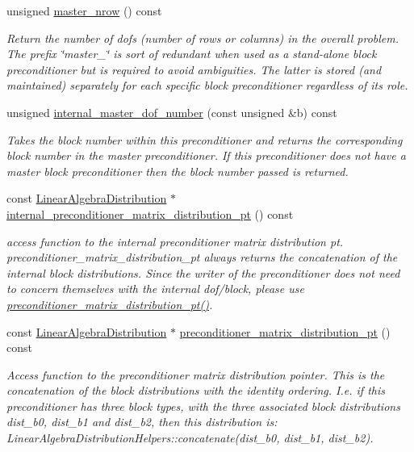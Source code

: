 \begin{DoxyCompactItemize}
unsigned \hyperlink{classoomph_1_1BlockPreconditioner_a3e5b553f65e6c25354a5c908d507e8ee}{master\+\_\+nrow} () const
\begin{DoxyCompactList}\small\item\em Return the number of dofs (number of rows or columns) in the overall problem. The prefix \char`\"{}master\+\_\+\char`\"{} is sort of redundant when used as a stand-\/alone block preconditioner but is required to avoid ambiguities. The latter is stored (and maintained) separately for each specific block preconditioner regardless of its role. \end{DoxyCompactList}\item 
unsigned \hyperlink{classoomph_1_1BlockPreconditioner_a7297e4d24c2c7ae7af6a9ad009669928}{internal\+\_\+master\+\_\+dof\+\_\+number} (const unsigned \&b) const
\begin{DoxyCompactList}\small\item\em Takes the block number within this preconditioner and returns the corresponding block number in the master preconditioner. If this preconditioner does not have a master block preconditioner then the block number passed is returned. \end{DoxyCompactList}\item 
const \hyperlink{classoomph_1_1LinearAlgebraDistribution}{Linear\+Algebra\+Distribution} $\ast$ \hyperlink{classoomph_1_1BlockPreconditioner_a3a16de88bd5369e729d761a6498fdd3f}{internal\+\_\+preconditioner\+\_\+matrix\+\_\+distribution\+\_\+pt} () const
\begin{DoxyCompactList}\small\item\em access function to the internal preconditioner matrix distribution pt. preconditioner\+\_\+matrix\+\_\+distribution\+\_\+pt always returns the concatenation of the internal block distributions. Since the writer of the preconditioner does not need to concern themselves with the internal dof/block, please use \hyperlink{classoomph_1_1BlockPreconditioner_a74eeff188f842dd8abdff1b7d9801d44}{preconditioner\+\_\+matrix\+\_\+distribution\+\_\+pt()}. \end{DoxyCompactList}\item 
const \hyperlink{classoomph_1_1LinearAlgebraDistribution}{Linear\+Algebra\+Distribution} $\ast$ \hyperlink{classoomph_1_1BlockPreconditioner_a74eeff188f842dd8abdff1b7d9801d44}{preconditioner\+\_\+matrix\+\_\+distribution\+\_\+pt} () const
\begin{DoxyCompactList}\small\item\em Access function to the preconditioner matrix distribution pointer. This is the concatenation of the block distributions with the identity ordering. I.\+e. if this preconditioner has three block types, with the three associated block distributions dist\+\_\+b0, dist\+\_\+b1 and dist\+\_\+b2, then this distribution is\+: Linear\+Algebra\+Distribution\+Helpers\+::concatenate(dist\+\_\+b0, dist\+\_\+b1, dist\+\_\+b2). \end{DoxyCompactList}\end{DoxyCompactItemize}
